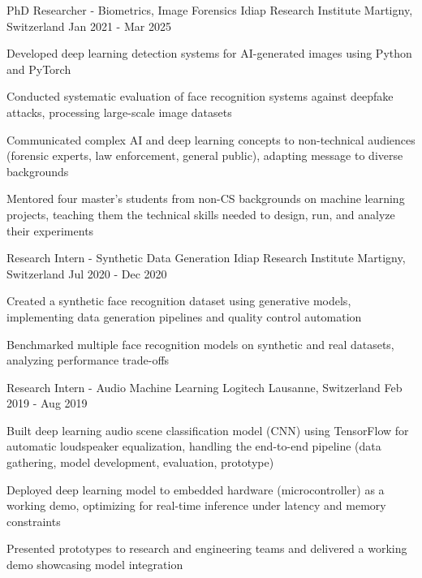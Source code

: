 \begin{cventries}
  \cventry
    {PhD Researcher - Biometrics, Image Forensics} %
    {Idiap Research Institute} %
    {Martigny, Switzerland} %
    {Jan 2021 - Mar 2025} %
    {
      \begin{cvitems} %
        \item {Developed deep learning detection systems for AI-generated images using Python and PyTorch}
        \item {Conducted systematic evaluation of face recognition systems against deepfake attacks, processing large-scale image datasets}
        \item {Communicated complex AI and deep learning concepts to non-technical audiences (forensic experts, law enforcement, general public), adapting message to diverse backgrounds}
        \item {Mentored four master's students from non-CS backgrounds on machine learning projects, teaching them the technical skills needed to design, run, and analyze their experiments}
      \end{cvitems}
    }

  \cventry
    {Research Intern - Synthetic Data Generation} %
    {Idiap Research Institute} %
    {Martigny, Switzerland} %
    {Jul 2020 - Dec 2020} %
    {
      \begin{cvitems} %
        \item {Created a synthetic face recognition dataset using generative models, implementing data generation pipelines and quality control automation}
        \item {Benchmarked multiple face recognition models on synthetic and real datasets, analyzing performance trade-offs}
      \end{cvitems}
    }

  \cventry
    {Research Intern - Audio Machine Learning} %
    {Logitech} %
    {Lausanne, Switzerland} %
    {Feb 2019 - Aug 2019} %
    {
      \begin{cvitems} %
        \item {Built deep learning audio scene classification model (CNN) using TensorFlow for automatic loudspeaker equalization, handling the end-to-end pipeline (data gathering, model development, evaluation, prototype)}
        \item {Deployed deep learning model to embedded hardware (microcontroller) as a working demo, optimizing for real-time inference under latency and memory constraints}
        \item {Presented prototypes to research and engineering teams and delivered a working demo showcasing model integration}
      \end{cvitems}
    }

\end{cventries}
